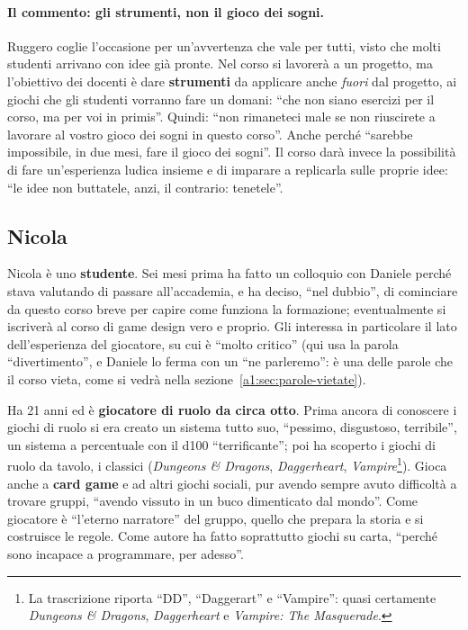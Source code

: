 \paragraph{Il commento: gli strumenti, non il gioco dei sogni.} Ruggero coglie
l'occasione per un'avvertenza che vale per tutti, visto che molti studenti
arrivano con idee già pronte. Nel corso si lavorerà a un progetto, ma
l'obiettivo dei docenti è dare \textbf{strumenti} da applicare anche
\emph{fuori} dal progetto, ai giochi che gli studenti vorranno fare un domani:
``che non siano esercizi per il corso, ma per voi in primis''. Quindi: ``non
rimaneteci male se non riuscirete a lavorare al vostro gioco dei sogni in questo
corso''. Anche perché ``sarebbe impossibile, in due mesi, fare il gioco dei
sogni''. Il corso darà invece la possibilità di fare un'esperienza ludica
insieme e di imparare a replicarla sulle proprie idee: ``le idee non buttatele,
anzi, il contrario: tenetele''.

\subsection{Nicola}

Nicola è uno \textbf{studente}. Sei mesi prima ha fatto un colloquio con Daniele
perché stava valutando di passare all'accademia, e ha deciso, ``nel dubbio'', di
cominciare da questo corso breve per capire come funziona la formazione;
eventualmente si iscriverà al corso di game design vero e proprio. Gli interessa
in particolare il lato dell'esperienza del giocatore, su cui è ``molto critico''
(qui usa la parola ``divertimento'', e Daniele lo ferma con un ``ne parleremo'':
è una delle parole che il corso vieta, come si vedrà nella
sezione~\ref{a1:sec:parole-vietate}).

Ha 21 anni ed è \textbf{giocatore di ruolo da circa otto}. Prima ancora di
conoscere i giochi di ruolo si era creato un sistema tutto suo, ``pessimo,
disgustoso, terribile'', un sistema a percentuale con il d100 ``terrificante'';
poi ha scoperto i giochi di ruolo da tavolo, i classici (\emph{Dungeons \&
Dragons}, \emph{Daggerheart}, \emph{Vampire}\footnote{La trascrizione riporta
``DD'', ``Daggerart'' e ``Vampire'': quasi certamente \emph{Dungeons \&
Dragons}, \emph{Daggerheart} e \emph{Vampire: The Masquerade}.}). Gioca anche a
\textbf{card game} e ad altri giochi sociali, pur avendo sempre avuto difficoltà
a trovare gruppi, ``avendo vissuto in un buco dimenticato dal mondo''. Come
giocatore è ``l'eterno narratore'' del gruppo, quello che prepara la storia e si
costruisce le regole. Come autore ha fatto soprattutto giochi su carta, ``perché
sono incapace a programmare, per adesso''.

